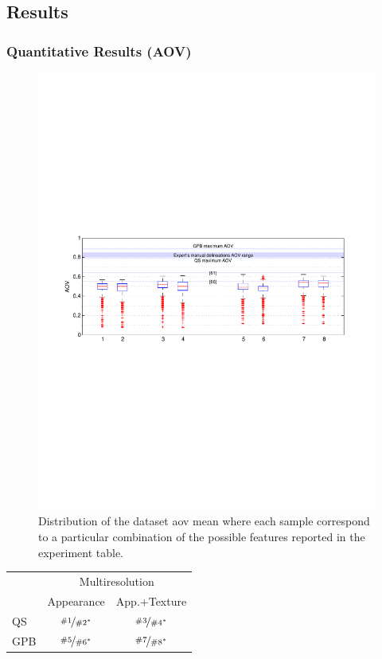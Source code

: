 \subsection{Results}
\begin{frame}\frametitle{Quantitative Results (AOV)}
\begin{figure}[Htbp]
\centering
\includegraphics[trim = 48 300 56 295, clip,height=.38\textwidth]{AOV}
\caption{Distribution of the dataset \acf{aov} mean where each sample correspond to a particular combination of the possible features reported in the experiment table.}
\label{fig:quantResultsAOV}
\end{figure}

\vspace{-15pt}
\centering
{\tiny {}
\begin{tabular}{l|c|c|}
\multicolumn{1}{c}{}&\multicolumn{2}{c}{Multiresolution} \\ \cmidrule{2-3}
	& Appearance & App.+Texture \\ \hline
QS	& $\nicefrac{\#1}{\#2^*}$ & $\nicefrac{\#3}{\#4^*}$ \\ \hline
GPB & $\nicefrac{\#5}{\#6^*}$ & $\nicefrac{\#7}{\#8^*}$ \\ \hline
\end{tabular}}
\end{frame}


